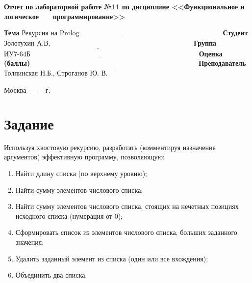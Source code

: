\documentclass[12pt]{report}
\begin{document}
\begin{titlepage}
		\begin{center}
			\noindent\begin{minipage}{1.1\textwidth}\centering
				\Large\textbf{Отчет по лабораторной работе №11}\newline
				\textbf{по дисциплине <<Функциональное и логическое}\newline
				\textbf{~~~программирование>>}\newline\newline
			\end{minipage}
		\end{center}
		
		\noindent\textbf{Тема} $\underline{\text{Рекурсия на Prolog~~~~~~~~~~~~~~~~~~~~~~~~~~~~~~~~~~~~~~~~~~~~~~~~~~~~~~~~~~~~~~}}$\newline\newline
		\noindent\textbf{Студент} $\underline{\text{Золотухин А.В.~~~~~~~~~~~~~~~~~~~~~~~~~~~~~~~~~~~~~~~~~~~~~~~~~~~~~~~~~~~~~~}}$\newline\newline
		\noindent\textbf{Группа} $\underline{\text{ИУ7-64Б~~~~~~~~~~~~~~~~~~~~~~~~~~~~~~~~~~~~~~~~~~~~~~~~~~~~~~~~~~~~~~~~~~~~~~~~~}}$\newline\newline
		\noindent\textbf{Оценка (баллы)} $\underline{\text{~~~~~~~~~~~~~~~~~~~~~~~~~~~~~~~~~~~~~~~~~~~~~~~~~~~~~~~~~~~~~~~~~~~~~~~~}}$\newline\newline
		\noindent\textbf{Преподаватель} $\underline{\text{Толпинская Н.Б., Строганов Ю. В.~~~~~~~~~~~~~~~~~~~~~~~~~~}}$\newline\newline\newline
		
		\begin{center}
			\vfill
			Москва~---~\the\year
			~г.
		\end{center}
	\end{titlepage}
	
	
	\section*{Задание}
	
	Используя хвостовую рекурсию, разработать (комментируя назначение аргументов) эффективную программу, позволяющую:
	\begin{enumerate}
		\item Найти длину списка (по верхнему уровню);
		\item Найти сумму элементов числового списка;
		\item Найти сумму элементов числового списка, стоящих на нечетных позициях исходного списка (нумерация от 0);
		\item Сформировать список из элементов числового списка, больших заданного значения;
		\item Удалить заданный элемент из списка (один или все вхождения);
		\item Объединить два списка.
	\end{enumerate}
	
\end{document}
